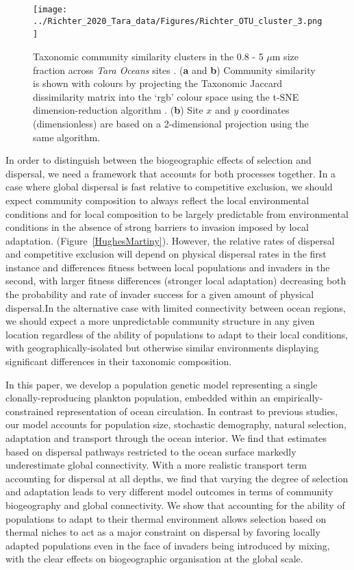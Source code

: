 \documentclass[12pt]{article}
\newcommand{\sinead}[1]{{\color{green} #1}}
\begin{document}
\begin{figure*}[t!]
    \centering
        \texttt{[image: ../Richter\_2020\_Tara\_data/Figures/Richter\_OTU\_cluster\_3.png]}\
    \caption{Taxonomic community similarity clusters in the 0.8 - 5 $\mu$m size fraction across \textit{Tara Oceans} sites \citep[replotted using data from][]{Richter:2019}. (\textbf{a} and \textbf{b}) Community similarity is shown with colours by projecting the Taxonomic Jaccard dissimilarity matrix into the `rgb' colour space using the t-SNE dimension-reduction algorithm \citep{VanDerMaaten:2014}. (\textbf{b}) Site $x$ and $y$ coordinates (dimensionless) are based on a 2-dimensional projection using the same algorithm.}
\label{Richter_Tara}
\end{figure*}

In order to distinguish between the biogeographic effects of selection and dispersal, we need a framework that accounts for both processes together. In a case where global dispersal is fast relative to competitive exclusion, we should expect community composition to always reflect the local environmental conditions \sinead{and for local composition to be largely predictable from environmental conditions in the absence of strong barriers to invasion imposed by local adaptation.}  (Figure~\ref{HughesMartiny}). \sinead{However, the relative rates of dispersal and competitive exclusion will depend on physical dispersal rates in the first instance and differences fitness between local populations and invaders in the second, with larger fitness differences (stronger local adaptation) decreasing both the probability and rate of invader success for a given amount of physical dispersal.}In the alternative case with limited connectivity between ocean regions, we should expect a more unpredictable community structure in any given location \sinead{regardless of the ability of populations to adapt to their local conditions}, with geographically-isolated but otherwise similar environments displaying significant differences in their taxonomic composition.

In this paper, we develop a population genetic model representing a single clonally-reproducing plankton population, embedded within an empirically-constrained representation of ocean circulation. In contrast to previous studies, our model accounts for population size, stochastic demography, natural selection, adaptation and transport through the ocean interior. We find that estimates based on dispersal pathways restricted to the ocean surface markedly underestimate global connectivity. With a more realistic transport term accounting for dispersal at all depths, we find that varying the degree of selection and adaptation leads to very different model outcomes in terms of community biogeography and global connectivity. We show that \sinead{accounting for the ability of populations to adapt to  their thermal environment allows} selection based on thermal niches \sinead{ to act} as a major constraint on dispersal \sinead{by favoring locally adapted populations even in the face of invaders being introduced by mixing}, with the clear effects on biogeographic organisation at the global scale.  
\end{document}

